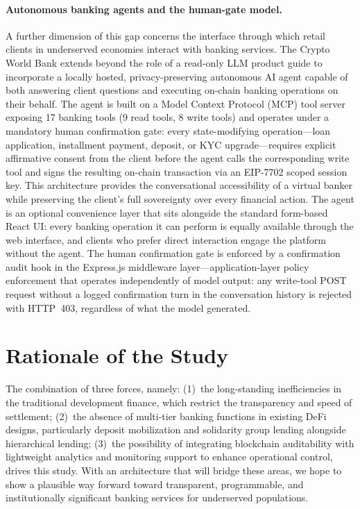 \documentclass[12pt,a4paper]{report}
\begin{document}
\paragraph{Autonomous banking agents and the human-gate model.}
A further dimension of this gap concerns the interface through which retail clients in underserved economies interact with banking services. The Crypto World Bank extends beyond the role of a read-only LLM product guide to incorporate a locally hosted, privacy-preserving autonomous AI agent capable of both answering client questions and executing on-chain banking operations on their behalf. The agent is built on a Model Context Protocol (MCP) tool server exposing 17 banking tools (9 read tools, 8 write tools) and operates under a mandatory human confirmation gate: every state-modifying operation---loan application, installment payment, deposit, or KYC upgrade---requires explicit affirmative consent from the client before the agent calls the corresponding write tool and signs the resulting on-chain transaction via an EIP-7702 scoped session key. This architecture provides the conversational accessibility of a virtual banker while preserving the client's full sovereignty over every financial action. The agent is an optional convenience layer that sits alongside the standard form-based React UI: every banking operation it can perform is equally available through the web interface, and clients who prefer direct interaction engage the platform without the agent. The human confirmation gate is enforced by a confirmation audit hook in the Express.js middleware layer---application-layer policy enforcement that operates independently of model output: any write-tool POST request without a logged confirmation turn in the conversation history is rejected with HTTP~403, regardless of what the model generated.

\section{Rationale of the Study}

The combination of three forces, namely: (1)~the long-standing inefficiencies in the traditional development finance, which restrict the transparency and speed of settlement; (2)~the absence of multi-tier banking functions in existing DeFi designs, particularly deposit mobilization and solidarity group lending alongside hierarchical lending; (3)~the possibility of integrating blockchain auditability with lightweight analytics and monitoring support to enhance operational control, drives this study. With an architecture that will bridge these areas, we hope to show a plausible way forward toward transparent, programmable, and institutionally significant banking services for underserved populations.
\end{document}
